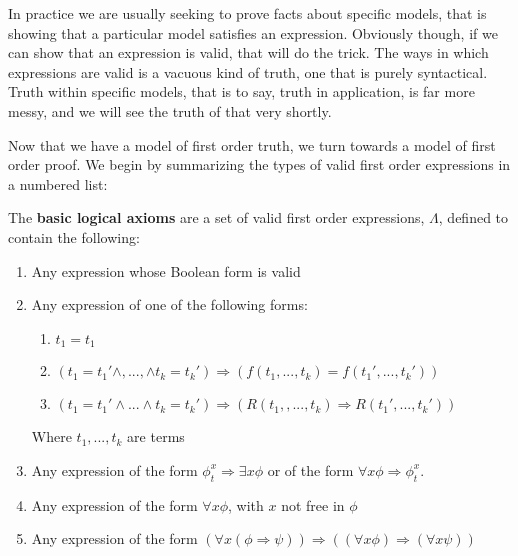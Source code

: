 \par In practice we are usually seeking to prove facts about specific models, that is showing that a particular model satisfies an expression. Obviously though, if we can show that an expression is valid, that will do the trick. The ways in which expressions are valid is a vacuous kind of truth, one that is purely syntactical. Truth within specific models, that is to say, truth in application, is far more messy, and we will see the truth of that very shortly.
\par Now that we have a model of first order truth, we turn towards a model of first order proof. We begin by summarizing the types of valid first order expressions in a numbered list:
\begin{definition}
    The \textbf{basic logical axioms} are a set of valid first order expressions, $\Lambda$, defined to contain the following:
    \begin{enumerate}
        \item Any expression whose Boolean form is valid
        \item Any expression of one of the following forms:
            \begin{enumerate}
                \item $t_1 = t_1$
                \item $(t_1 = t_1' \wedge,...,\wedge t_k = t_k') \Rightarrow (f(t_1,...,t_k) = f(t_1',...,t_k'))$
                \item $(t_1 = t_1' \wedge ... \wedge t_k = t_k') \Rightarrow (R(t_1,,...,t_k) \Rightarrow R(t_1',...,t_k'))$
            \end{enumerate}
            Where $t_1,...,t_k$ are terms
        \item Any expression of the form $\phi_t^x \Rightarrow \exists x \phi$ or of the form $\forall x \phi \Rightarrow \phi_t^x$.
        \item Any expression of the form $\forall x \phi$, with $x$ not free in $\phi$
        \item Any expression of the form $(\forall x (\phi \Rightarrow \psi)) \Rightarrow ((\forall x \phi) \Rightarrow (\forall x \psi))$
    \end{enumerate}
\end{definition}

